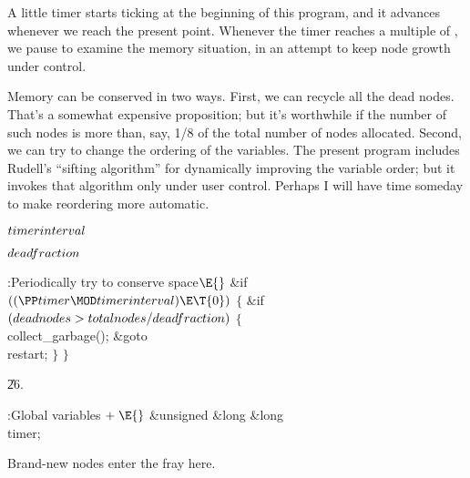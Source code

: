 A little timer starts ticking at the beginning of this program,
and it advances whenever we reach the present point.
Whenever the timer reaches a multiple of , we pause to
examine the memory situation, in an attempt to keep node growth under
control.

Memory can be conserved in two ways. First, we can recycle all the dead
nodes. That's a somewhat expensive proposition; but it's worthwhile
if the number of such nodes is more than, say, 1/8 of the total
number of nodes allocated. Second, we can try to change the ordering
of the variables. The present program includes Rudell's
``sifting algorithm'' for dynamically improving the variable order; but
it invokes that algorithm only under user control. Perhaps I will have
time someday to make reordering more automatic.

\Y\B\4\D$\\{timerinterval}$ \5
\par
\B\4\D$\\{deadfraction}$ \5
\par
\Y\B\4:Periodically try to conserve space\X${}\E{}$\6
\&{if} ${}((\PP\\{timer}\MOD\\{timerinterval})\E\T{0}){}$\5
${}\{{}$\1\6
\&{if} ${}(\\{deadnodes}>\\{totalnodes}/\\{deadfraction}){}$\5
${}\{{}$\1\6
\\{collect\_garbage}();\6
\&{goto} \\{restart};\6
\4${}\}{}$\2\6
\4${}\}{}$\2\par
\U26.\fi

\B{}:Global variables\X${}\mathrel+\E{}$\6
\&{unsigned} \&{long} \&{long} \\{timer};\par
\fi

Brand-new nodes enter the fray here.


